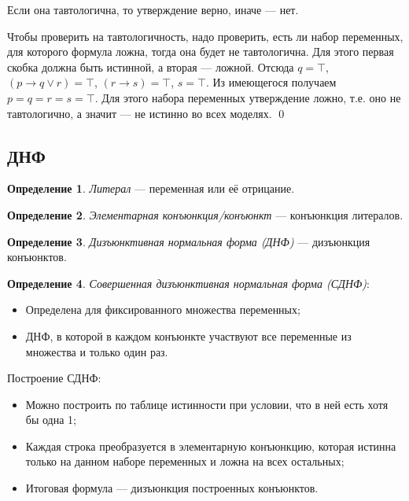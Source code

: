 \documentclass[12pt]{article}
\let\im\rightarrow
\theoremstyle{definition}
\newtheorem{definition}{Определение}[section]
\theoremstyle{plain}
\theoremstyle{remark}
\begin{document}
Если она тавтологична, то утверждение верно, иначе --- нет.

Чтобы проверить на тавтологичность, надо проверить, есть ли набор
переменных, для которого формула ложна, тогда она будет не
тавтологична. Для этого первая скобка должна быть истинной, а вторая
--- ложной. Отсюда $q = \top$, $(p \im q \lor r) = \top$, $(r \im s)
= \top$, $s = \top$. Из имеющегося получаем $p = q = r = s = \top$.
Для этого набора переменных утверждение ложно, т.е. оно не
тавтологично, а значит --- не истинно во всех моделях. \qed

\subsection{ДНФ}

\begin{definition}
  \textit{Литерал} --- переменная или её отрицание.
\end{definition}

\begin{definition}
  \textit{Элементарная конъюнкция/конъюнкт} --- конъюнкция литералов.
\end{definition}

\begin{definition}
  \textit{Дизъюнктивная нормальная форма (ДНФ)} --- дизъюнкция конъюнктов.
\end{definition}

\begin{definition}
  \textit{Совершенная дизъюнктивная нормальная форма (СДНФ)}:
  \begin{itemize}
    \item Определена для фиксированного множества переменных;

    \item ДНФ, в которой в каждом конъюнкте участвуют все переменные из
      множества и только один раз.
  \end{itemize}
\end{definition}

Построение СДНФ:
\begin{itemize}
  \item Можно построить по таблице истинности при условии, что в ней
    есть хотя бы одна 1;

  \item Каждая строка преобразуется в элементарную конъюнкцию,
    которая истинна только на данном наборе переменных и ложна на
    всех остальных;

  \item Итоговая формула --- дизъюнкция построенных конъюнктов.
\end{itemize}
\end{document}
